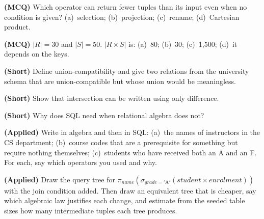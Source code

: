 \begin{reviewq}
  \item \textbf{(MCQ)} Which operator can return fewer tuples than its input
        even when no condition is given? (a)~selection; (b)~projection;
        (c)~rename; (d)~Cartesian product.
  \item \textbf{(MCQ)} $|R| = 30$ and $|S| = 50$. $|R \times S|$ is:
        (a)~80; (b)~30; (c)~1{,}500; (d)~it depends on the keys.
  \item \textbf{(Short)} Define union-compatibility and give two relations
        from the university schema that are union-compatible but whose union
        would be meaningless.
  \item \textbf{(Short)} Show that intersection can be written using only
        difference.
  \item \textbf{(Short)} Why does SQL need  when relational
        algebra does not?
  \item \textbf{(Applied)} Write in algebra and then in SQL: (a)~the names of
        instructors in the CS department; (b)~course codes that are a
        prerequisite for something but require nothing themselves;
        (c)~students who have received both an A and an F. For each, say which
        operators you used and why.
  \item \textbf{(Applied)} Draw the query tree for
        $\pi_{\mathit{name}}(\sigma_{\mathit{grade}=\mathrm{'A'}}
        (\mathit{student} \times \mathit{enrolment}))$ with the join condition
        added. Then draw an equivalent tree that is cheaper, say which
        algebraic law justifies each change, and estimate from the seeded
        table sizes how many intermediate tuples each tree produces.
\end{reviewq}
